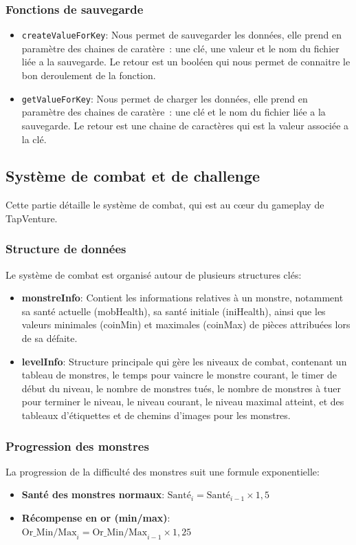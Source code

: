 \documentclass[11pt,a4paper]{article}
\begin{document}
\subsubsection{Fonctions de sauvegarde}
\begin{itemize}
    \item \texttt{createValueForKey}: Nous permet de sauvegarder les données, elle prend en paramètre des chaines de caratère~: une clé, une valeur et 
    le nom du fichier liée a la sauvegarde. Le retour est un booléen qui nous permet de connaitre le bon deroulement de la fonction.
    \item \texttt{getValueForKey}: Nous permet de charger les données, elle prend en paramètre des chaines de caratère~: une clé et le nom du fichier 
    liée a la sauvegarde. Le retour est une chaine de caractères qui est la valeur associée a la clé.
\end{itemize}

\subsection{Système de combat et de challenge}
Cette partie détaille le système de combat, qui est au cœur du gameplay de TapVenture.

\subsubsection{Structure de données}
Le système de combat est organisé autour de plusieurs structures clés:
\begin{itemize}
    \item \textbf{monstreInfo}: Contient les informations relatives à un monstre, notamment sa santé actuelle (mobHealth), sa santé initiale (iniHealth), ainsi que les valeurs minimales (coinMin) et maximales (coinMax) de pièces attribuées lors de sa défaite.
    \item \textbf{levelInfo}: Structure principale qui gère les niveaux de combat, contenant un tableau de monstres, le temps pour vaincre le monstre courant, le timer de début du niveau, le nombre de monstres tués, le nombre de monstres à tuer pour terminer le niveau, le niveau courant, le niveau maximal atteint, et des tableaux d'étiquettes et de chemins d'images pour les monstres.
\end{itemize}

\subsubsection{Progression des monstres}
La progression de la difficulté des monstres suit une formule exponentielle:
\begin{itemize}
    \item \textbf{Santé des monstres normaux}: $\text{Santé}_i = \text{Santé}_{i-1} \times 1,5$
\item \textbf{Récompense en or (min/max)}:\\ $\text{Or\_Min/Max}_i = \text{Or\_Min/Max}_{i-1} \times 1,25$
\end{itemize}
\end{document}

